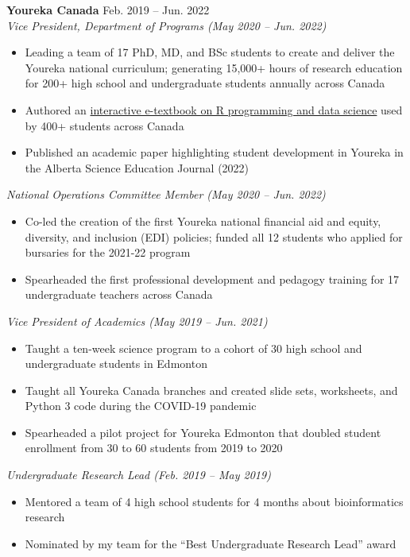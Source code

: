 \documentclass{article}
\begin{document}
\textbf{Youreka Canada} \hfill Feb. 2019 -- Jun. 2022 \\
\textit{Vice President, Department of Programs (May 2020 -- Jun. 2022)}
\begin{itemize}
    \item Leading a team of 17 PhD, MD, and BSc students to create and deliver the Youreka national curriculum; generating 15,000+ hours of research education for 200+ high school and undergraduate students annually across Canada
    \item Authored an \href{https://youreka-textbook.netlify.app/}{interactive e-textbook on R programming and data science} used by 400+ students across Canada
    \item Published an academic paper highlighting student development in Youreka in the Alberta Science Education Journal (2022)
\end{itemize} \vspace{1em}
\textit{National Operations Committee Member (May 2020 -- Jun. 2022)}
\begin{itemize}
    \item Co-led the creation of the first Youreka national financial aid and equity, diversity, and inclusion (EDI) policies; funded all 12 students who applied for bursaries for the 2021-22 program
    \item Spearheaded the first professional development and pedagogy training for 17 undergraduate teachers across Canada
\end{itemize} \vspace{1em}
\textit{Vice President of Academics (May 2019 -- Jun. 2021)}
\begin{itemize}
    \item Taught a ten-week science program to a cohort of 30 high school and undergraduate students in Edmonton
    \item Taught all Youreka Canada branches and created slide sets, worksheets, and Python 3 code during the COVID-19 pandemic
    \item Spearheaded a pilot project for Youreka Edmonton that doubled student enrollment from 30 to 60 students from 2019 to 2020
\end{itemize} \vspace{1em}
\textit{Undergraduate Research Lead (Feb. 2019 -- May 2019)}
\begin{itemize}
    \item Mentored a team of 4 high school students for 4 months about bioinformatics research
    \item Nominated by my team for the ``Best Undergraduate Research Lead'' award
\end{itemize} \vspace{1em}
\end{document}
